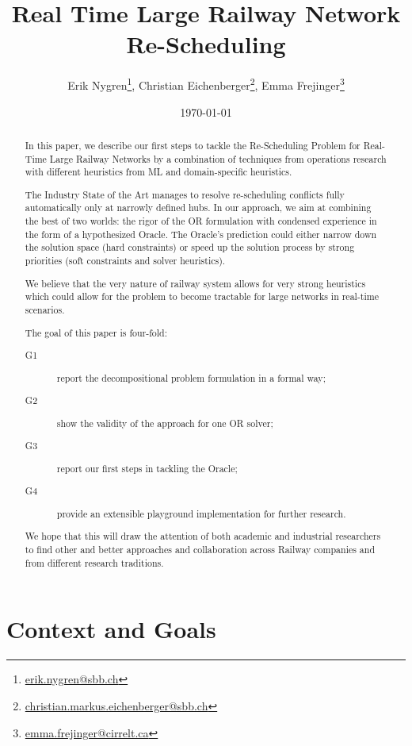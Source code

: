 \documentclass{article}
\title{Real Time Large Railway Network Re-Scheduling}
\author{Erik Nygren\footnote{\url{erik.nygren@sbb.ch}}, Christian Eichenberger\footnote{\url{christian.markus.eichenberger@sbb.ch}}, Emma Frejinger\footnote{\url{emma.frejinger@cirrelt.ca}}}
\date{\today}
\begin{document}
\maketitle

\tableofcontents
\begin{abstract}
In this paper, we describe our first steps to tackle the Re-Scheduling Problem for Real-Time Large Railway Networks by a combination of techniques from operations research with different heuristics from ML and domain-specific heuristics.

The Industry State of the Art manages to resolve re-scheduling conflicts fully automatically only at narrowly defined hubs. In our approach, we aim at combining the best of two worlds: the rigor of the OR formulation with condensed experience in the form of a hypothesized Oracle. The Oracle's prediction could either narrow down the solution space (hard constraints) or speed up the solution process by strong priorities (soft constraints and solver heuristics).

We believe that the very nature of railway system allows for very strong heuristics which could allow for the problem to become tractable for large networks in real-time scenarios.

The goal of this paper is four-fold:
\begin{description}
\item[G1] report the decompositional problem formulation in a formal way;
\item[G2] show the validity of the approach for one OR solver;
\item[G3] report our first steps in tackling the Oracle;
\item[G4] provide an extensible playground implementation for further research.
\end{description}
 We hope that this will draw the attention of both academic and industrial researchers to find other and better approaches and collaboration across Railway companies and from different research traditions.
\end{abstract}




\section{Context and Goals}
\end{document}
